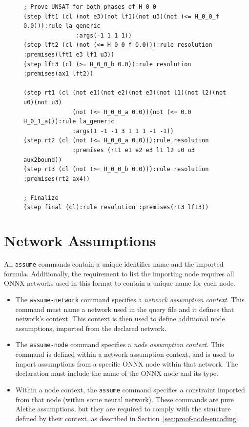 \begin{figure}[p]
\begin{lstlisting}[style=lbnf,basicstyle=\ttfamily\scriptsize\bfseries,linewidth=1.05\textwidth]
; Prove UNSAT for both phases of H_0_0
(step lft1 (cl (not e3)(not lf1)(not u3)(not (<= H_0_0_f 0.0))):rule la_generic 
               :args(-1 1 1 1))
(step lft2 (cl (not (<= H_0_0_f 0.0))):rule resolution :premises(lft1 e3 lf1 u3))
(step lft3 (cl (>= H_0_0_b 0.0)):rule resolution :premises(ax1 lft2))
	
(step rt1 (cl (not e1)(not e2)(not e3)(not l1)(not l2)(not u0)(not u3)
              (not (<= H_0_0_a 0.0))(not (<= 0.0 H_0_1_a))):rule la_generic 
              :args(1 -1 -1 3 1 1 1 -1 -1))
(step rt2 (cl (not (<= H_0_0_a 0.0))):rule resolution 
              :premises (rt1 e1 e2 e3 l1 l2 u0 u3 aux2bound))
(step rt3 (cl (not (>= H_0_0_b 0.0))):rule resolution :premises(rt2 ax4))
	
; Finalize
(step final (cl):rule resolution :premises(rt3 lft3))
\end{lstlisting}
\label{lst:proof}
\end{figure}


\section{Network Assumptions}
\label{sec:proof-assumptions}


	All \texttt{assume} commands contain a unique identifier name and the imported formula. Additionally, the requirement to list the importing node requires all ONNX networks used in this format to contain a unique name for each node.
	\begin{itemize}	
	\item The \texttt{assume-network} command specifies a \emph{network assumption context}. This command must name a network used in the \vnnlib{} query file and it defines that network's context. This context is then used to define additional node assumptions, imported from the declared network.
	\item The \texttt{assume-node} command specifies a \emph{node assumption context}. This command is defined within a network assumption context, and is used to import assumptions from a specific ONNX node within that network. The declaration must include the name of the ONNX node and its type.
	\item Within a node context, the \texttt{assume} command specifies a constraint imported from that node (within some neural network). These commands are pure Alethe assumptions, but they are required to comply with the structure defined by their  context, as described in Section~\ref{sec:proof-node-encoding}.
	\end{itemize}
	
